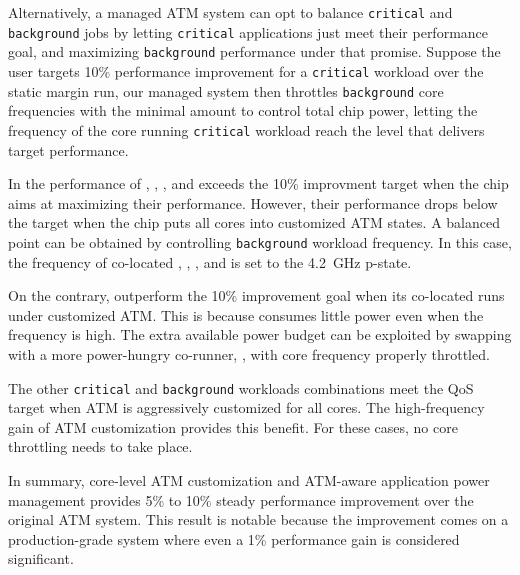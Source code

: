 Alternatively, a managed ATM system can opt to balance \texttt{critical} and \texttt{background} jobs by letting \texttt{critical} applications just meet their performance goal, and maximizing \texttt{background} performance under that promise. Suppose the user targets 10\% performance improvement for a \texttt{critical} workload over the static margin run, our managed system then throttles \texttt{background} core frequencies with the minimal amount to control total chip power, letting the frequency of the core running \texttt{critical} workload reach the level that delivers target performance.

In  the performance of , , , and  exceeds the 10\% improvment target when the chip aims at maximizing their performance. However, their performance drops below the target when the chip puts all cores into customized ATM states. A balanced point can be obtained by controlling \texttt{background} workload frequency. In this case, the frequency of co-located , , , and  is set to the 4.2~GHz p-state.

On the contrary,  outperform the 10\% improvement goal when its co-located  runs under customized ATM. This is because  consumes little power even when the frequency is high. The extra available power budget can be exploited by swapping  with a more power-hungry co-runner, , with core frequency properly throttled. 

The other \texttt{critical} and \texttt{background} workloads combinations meet the QoS target when ATM is aggressively customized for all cores. The high-frequency gain of ATM customization provides this benefit. For these cases, no core throttling needs to take place.

In summary, core-level ATM customization and ATM-aware application power management provides 5\% to 10\% steady performance improvement over the original ATM system. This result is notable because the improvement comes on a production-grade system where even a 1\% performance gain is considered significant.
